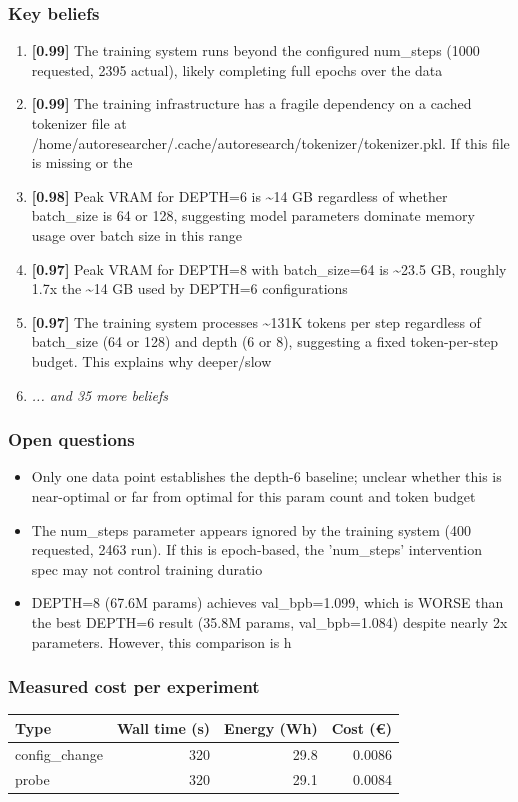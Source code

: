 \documentclass[10pt,a4paper,twocolumn]{article}
\begin{document}
\subsubsection*{Key beliefs}
\begin{enumerate}
\small
  \item \textbf{[0.99]} The training system runs beyond the configured num\_steps (1000 requested, 2395 actual), likely completing full epochs over the data
  \item \textbf{[0.99]} The training infrastructure has a fragile dependency on a cached tokenizer file at /home/autoresearcher/.cache/autoresearch/tokenizer/tokenizer.pkl. If this file is missing or the 
  \item \textbf{[0.98]} Peak VRAM for DEPTH=6 is \textasciitilde{}14 GB regardless of whether batch\_size is 64 or 128, suggesting model parameters dominate memory usage over batch size in this range
  \item \textbf{[0.97]} Peak VRAM for DEPTH=8 with batch\_size=64 is \textasciitilde{}23.5 GB, roughly 1.7x the \textasciitilde{}14 GB used by DEPTH=6 configurations
  \item \textbf{[0.97]} The training system processes \textasciitilde{}131K tokens per step regardless of batch\_size (64 or 128) and depth (6 or 8), suggesting a fixed token-per-step budget. This explains why deeper/slow
  \item[] \textit{... and 35 more beliefs}
\end{enumerate}

\subsubsection*{Open questions}
\begin{itemize}
\small
  \item Only one data point establishes the depth-6 baseline; unclear whether this is near-optimal or far from optimal for this param count and token budget
  \item The num\_steps parameter appears ignored by the training system (400 requested, 2463 run). If this is epoch-based, the 'num\_steps' intervention spec may not control training duratio
  \item DEPTH=8 (67.6M params) achieves val\_bpb=1.099, which is WORSE than the best DEPTH=6 result (35.8M params, val\_bpb=1.084) despite nearly 2x parameters. However, this comparison is h
\end{itemize}

\subsubsection*{Measured cost per experiment}
\begin{table}[h]
\centering
\small
\begin{tabular}{lrrr}
\toprule
Type & Wall time (s) & Energy (Wh) & Cost (\euro{{}}) \\
\midrule
  config\_change & 320 & 29.8 & 0.0086 \\
  probe & 320 & 29.1 & 0.0084 \\
\bottomrule
\end{tabular}
\end{table}
\end{document}

